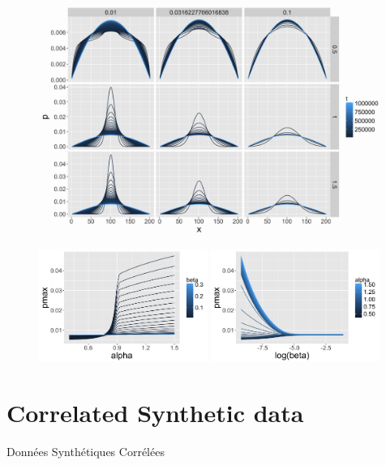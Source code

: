 \begin{figure}[!h]
\centering
\includegraphics[width=\textwidth]{Figures/Density/stationary}
\label{fig:stationary}
\end{figure}



\begin{figure}[!h]
\centering
\includegraphics[width=0.49\textwidth]{Figures/Density/pmax_alpha}
\includegraphics[width=0.49\textwidth]{Figures/Density/pmax_logbeta}
\label{fig:pmax}
\end{figure}








\newpage

\section{Correlated Synthetic data}{Données Synthétiques Corrélées}

\label{app:sec:correlatedsyntheticdata}








